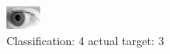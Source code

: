 \begin{figure}[h!]
\begin{center}
\includegraphics[width=0.60\columnwidth]{figures/ID246_class_4_target_3.png}
\end{center}
\caption{ Classification: 4 actual target: 3}
\label{fig:ID246_class_4_target_3}
\end{figure}
